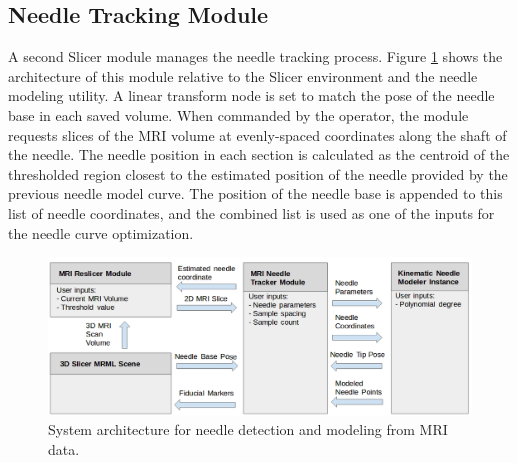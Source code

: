 \subsection{Needle Tracking Module}
A second Slicer module manages the needle tracking process. Figure \ref{fig:MRI_architecture} shows the architecture of this module relative to the Slicer environment and the needle modeling utility. A linear transform node is set to match the pose of the needle base in each saved volume. When commanded by the operator, the module requests slices of the MRI volume at evenly-spaced coordinates along the shaft of the needle. The needle position in each section is calculated as the centroid of the thresholded region closest to the estimated position of the needle provided by the previous needle model curve. The position of the needle base is appended to this list of needle coordinates, and the combined list is used as one of the inputs for the needle curve optimization.

\begin{figure}[h]
\includegraphics[width=1.0\textwidth]{Fig/chap5/MRI_software_architecture.png}
\caption{System architecture for needle detection and modeling from MRI data.}
\label{fig:MRI_architecture}
\end{figure}


